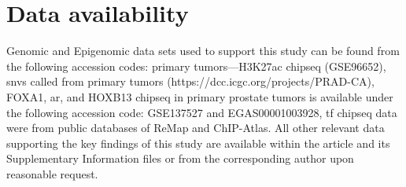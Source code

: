 \section{Data availability}

Genomic and Epigenomic data sets used to support this study can be found from the following accession codes: primary tumors—H3K27ac \gls{chipseq} (GSE96652), \glspl{snv} called from primary tumors (https://dcc.icgc.org/projects/PRAD-CA), FOXA1, \gls{ar}, and HOXB13 \gls{chipseq} in primary prostate tumors is available under the following accession code: GSE137527 and EGAS00001003928, \gls{tf} \gls{chipseq} data were from public databases of ReMap and ChIP-Atlas.
All other relevant data supporting the key findings of this study are available within the article and its Supplementary Information files or from the corresponding author upon reasonable request.

